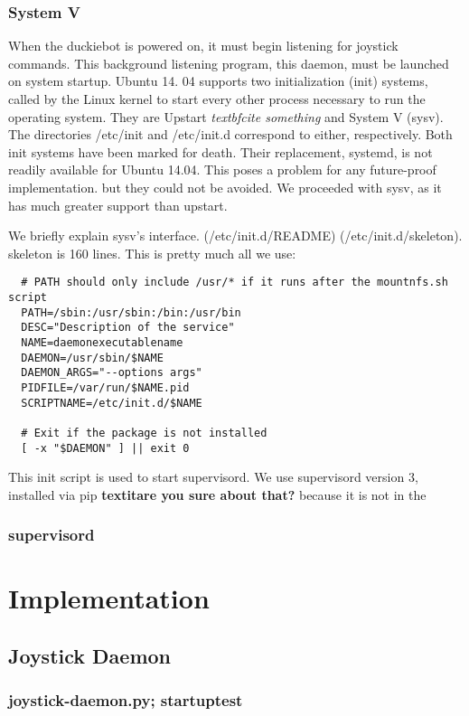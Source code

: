\documentclass[titlepage]{article}
\begin{document}
\subsubsection{System V}
When the duckiebot is powered on, it must begin listening for joystick commands. This background listening program, this daemon, must be launched on system startup. Ubuntu 14. 04 supports two initialization (init) systems, called by the Linux kernel to start every other process necessary to run the operating system. They are Upstart \textit{textbf{cite something}} and System V (sysv). The directories /etc/init and /etc/init.d correspond to either, respectively. Both init systems have been marked for death. Their replacement, systemd, is not readily available for Ubuntu 14.04. This poses a problem for any future-proof implementation. but they could not be avoided. We proceeded with sysv, as it has much greater support than upstart. 

We briefly explain sysv's interface. (/etc/init.d/README) (/etc/init.d/skeleton).  skeleton is 160 lines. 
This is pretty much all we use:
 
\begin{lstlisting}
  # PATH should only include /usr/* if it runs after the mountnfs.sh script
  PATH=/sbin:/usr/sbin:/bin:/usr/bin
  DESC="Description of the service"
  NAME=daemonexecutablename
  DAEMON=/usr/sbin/$NAME
  DAEMON_ARGS="--options args"
  PIDFILE=/var/run/$NAME.pid
  SCRIPTNAME=/etc/init.d/$NAME
 
  # Exit if the package is not installed
  [ -x "$DAEMON" ] || exit 0
\end{lstlisting}

This init script is used to start supervisord. We use supervisord version 3, installed via pip \textbf{textit{are you sure about that?}} because it is not in the 
\subsubsection{supervisord}

\section{Implementation}
\subsection{Joystick Daemon}
\subsubsection{joystick-daemon.py; startuptest}
\end{document}
